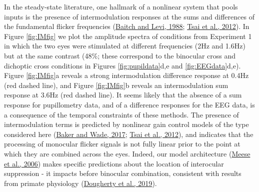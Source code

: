 \documentclass[
]{article}
\begin{document}
In the steady-state literature, one hallmark of a nonlinear system that pools inputs is the presence of intermodulation responses at the sums and differences of the fundamental flicker frequencies (\protect\hyperlink{ref-Baitch1988}{Baitch and Levi, 1988}; \protect\hyperlink{ref-Tsai2012}{Tsai et al., 2012}). In Figure \ref{fig:IMfig} we plot the amplitude spectra of conditions from Experiment 1 in which the two eyes were stimulated at different frequencies (2Hz and 1.6Hz) but at the same contrast (48\%; these correspond to the binocular cross and dichoptic cross conditions in Figures \ref{fig:pupildata}d,e and \ref{fig:EEGdata}d,e). Figure \ref{fig:IMfig}a reveals a strong intermodulation difference response at 0.4Hz (red dashed line), and Figure \ref{fig:IMfig}b reveals an intermodulation sum response at 3.6Hz (red dashed line). It seems likely that the absence of a sum response for pupillometry data, and of a difference responses for the EEG data, is a consequence of the temporal constraints of these methods. The presence of intermodulation terms is predicted by nonlinear gain control models of the type considered here (\protect\hyperlink{ref-Baker2017}{Baker and Wade, 2017}; \protect\hyperlink{ref-Tsai2012}{Tsai et al., 2012}), and indicates that the processing of monocular flicker signals is not fully linear prior to the point at which they are combined across the eyes. Indeed, our model architecture (\protect\hyperlink{ref-Meese2006}{Meese et al., 2006}) makes specific predictions about the location of interocular suppression - it impacts before binocular combination, consistent with results from primate physiology (\protect\hyperlink{ref-Dougherty2019}{Dougherty et al., 2019}).
\end{document}

